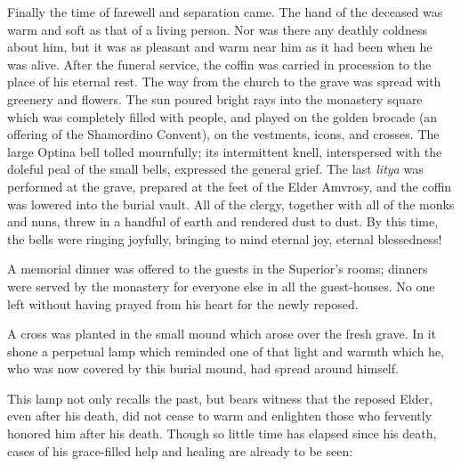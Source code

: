 Finally the time of farewell and separation came. The hand of the deceased was warm and soft as that of a living person. Nor was there any deathly coldness about him, but it was as pleasant and warm near him as it had been when he was alive. After the funeral service, the coffin was carried in procession to the place of his eternal rest. The way from the church to the grave was spread with greenery and flowers. The sun poured bright rays into the monastery square which was completely filled with people, and played on the golden brocade (an offering of the Shamordino Convent), on the vestments, icons, and crosses. The large Optina bell tolled mournfully; its intermittent knell, interspersed with the doleful peal of the small bells, expressed the general grief. The last \textit{litya} was performed at the grave, prepared at the feet of the Elder Amvrosy, and the coffin was lowered into the burial vault. All of the clergy, together with all of the monks and nuns, threw in a handful of earth and rendered dust to dust. By this time, the bells were ringing joyfully, bringing to mind eternal joy, eternal blessedness!

A memorial dinner was offered to the guests in the Superior's rooms; dinners were served by the monastery for everyone else in all the guest-houses. No one left without having prayed from his heart for the newly reposed.

A cross was planted in the small mound which arose over the fresh grave. In it shone a perpetual lamp which reminded one of that light and warmth which he, who was now covered by this burial mound, had spread around himself.

This lamp not only recalls the past, but bears witness that the reposed Elder, even after his death, did not cease to warm and enlighten those who fervently honored him after his death. Though so little time has elapsed since his death, cases of his grace-filled help and healing are already to be seen:

